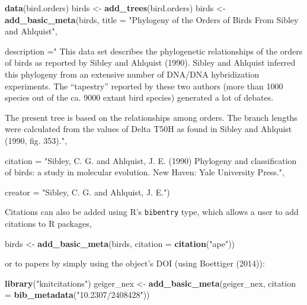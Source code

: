\documentclass[author-year, review, 11pt]{components/elsarticle} %
\newenvironment{Shaded}{\begin{snugshade}}{\end{snugshade}}
\newcommand{\KeywordTok}[1]{\textcolor[rgb]{0.13,0.29,0.53}{\textbf{{#1}}}}
\newcommand{\DataTypeTok}[1]{\textcolor[rgb]{0.13,0.29,0.53}{{#1}}}
\newcommand{\StringTok}[1]{\textcolor[rgb]{0.31,0.60,0.02}{{#1}}}
\newcommand{\NormalTok}[1]{{#1}}
\begin{document}
\begin{Shaded}
\begin{Highlighting}[]
\KeywordTok{data}\NormalTok{(bird.orders)}
\NormalTok{birds <-}\StringTok{ }\KeywordTok{add_trees}\NormalTok{(bird.orders)}
\NormalTok{birds <-}\StringTok{ }\KeywordTok{add_basic_meta}\NormalTok{(birds,}
  \DataTypeTok{title =} \StringTok{"Phylogeny of the Orders of Birds From Sibley and Ahlquist"}\NormalTok{,}

  \DataTypeTok{description =}\StringTok{" This data set describes the phylogenetic relationships of the}
\StringTok{     orders of birds as reported by Sibley and Ahlquist (1990). Sibley}
\StringTok{     and Ahlquist inferred this phylogeny from an extensive number of}
\StringTok{     DNA/DNA hybridization experiments. The ``tapestry'' reported by}
\StringTok{     these two authors (more than 1000 species out of the ca. 9000}
\StringTok{     extant bird species) generated a lot of debates.}

\StringTok{     The present tree is based on the relationships among orders. The}
\StringTok{     branch lengths were calculated from the values of Delta T50H as}
\StringTok{     found in Sibley and Ahlquist (1990, fig. 353)."}\NormalTok{,}

  \DataTypeTok{citation =} \StringTok{"Sibley, C. G. and Ahlquist, J. E. (1990) Phylogeny and}
\StringTok{     classification of birds: a study in molecular evolution. New}
\StringTok{     Haven: Yale University Press."}\NormalTok{,}

  \DataTypeTok{creator =} \StringTok{"Sibley, C. G. and Ahlquist, J. E."}\NormalTok{)}
\end{Highlighting}
\end{Shaded}

Citations can also be added using R's \texttt{bibentry} type, which
allows a user to add citations to R packages,

\begin{Shaded}
\begin{Highlighting}[]
\NormalTok{birds <-}\StringTok{ }\KeywordTok{add_basic_meta}\NormalTok{(birds, }\DataTypeTok{citation =} \KeywordTok{citation}\NormalTok{(}\StringTok{"ape"}\NormalTok{))}
\end{Highlighting}
\end{Shaded}

or to papers by simply using the object's DOI (using Boettiger (2014)):

\begin{Shaded}
\begin{Highlighting}[]
\KeywordTok{library}\NormalTok{(}\StringTok{"knitcitations"}\NormalTok{)}
\NormalTok{geiger_nex <-}\StringTok{ }\KeywordTok{add_basic_meta}\NormalTok{(geiger_nex, }\DataTypeTok{citation =} \KeywordTok{bib_metadata}\NormalTok{(}\StringTok{"10.2307/2408428"}\NormalTok{))}
\end{Highlighting}
\end{Shaded}
\end{document}
